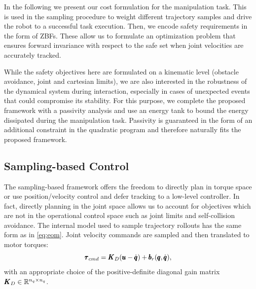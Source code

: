 In the following we present our cost formulation for the manipulation task. This is used in the sampling procedure to weight different trajectory samples and drive the robot to a successful task execution. Then, we encode safety requirements in the form of ZBFs. These allow us to formulate an optimization problem that ensures forward invariance with respect to the safe set when joint velocities are accurately tracked.

While the safety objectives here are formulated on a kinematic level (obstacle avoidance, joint and cartesian limits), we are also interested in the robustness of the dynamical system during interaction, especially in cases of unexpected events that could compromise its stability. For this purpose, we complete the proposed framework with a passivity analysis and use an energy tank to bound the energy dissipated during the manipulation task. Passivity is guaranteed in the form of an additional constraint in the quadratic program and therefore naturally fits the proposed framework.

\subsection{Sampling-based Control}
The sampling-based framework offers the freedom to directly plan in torque space or use position/velocity control and defer tracking to a low-level controller. In fact, directly planning in the joint space allows us to account for objectives which are not in the operational control space such as joint limits and self-collision avoidance. The internal model used to sample trajectory rollouts has the same form as in \eqref{eq:eom}. Joint velocity commands are sampled and then translated to motor torques:
\begin{equation} \label{eq:cmd_sim}
    \pmb{\tau}_{cmd} = \pmb{K}_{D} (\pmb{u} - \dot{\pmb{q}}) + \pmb{b}_{r}(\pmb{q}, \dot{\pmb{q}}),
\end{equation}
with an appropriate choice of the positive-definite diagonal gain matrix $\pmb{K}_{D} \in \mathbb{R}^{n_q\times n_q}$. 

